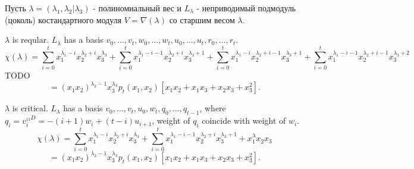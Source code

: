 Пусть $ \lambda = (\lambda_1, \lambda_2 | \lambda_3) $ - полиномиальный вес и $L_{\lambda}$ - неприводимый подмодуль (цоколь) костандартного модуля $V = \nabla(\lambda)$ со старшим весом $\lambda$.

$\lambda$ is reqular.
$L_\lambda$ has a basis $v_0, \ldots, v_t, w_0, \ldots, w_t, u_0, \ldots, u_t, r_0, \ldots, r_t$.
$$\chi(\lambda) = \sum\limits_{i=0}^{t}x_1^{\lambda_1 - i}x_2^{\lambda_2 + i}x_3^{\lambda_3} + \sum\limits_{i=0}^{t}x_1^{\lambda_1 - i - 1}x_2^{\lambda_2 + i}x_3^{\lambda_3 + 1} +
\sum\limits_{i=0}^{t}x_1^{\lambda_1 - i}x_2^{\lambda_2 + i - 1}x_3^{\lambda_3 + 1} + 
\sum\limits_{i=0}^{t}x_1^{\lambda_1 - i - 1}x_2^{\lambda_2 + i- 1}x_3^{\lambda_3 + 2}$$
TODO
$$ = (x_1 x_2)^{\lambda_2 - 1}x_3^{\lambda_3}p_t (x_1, x_2) [x_1 x_2 + x_1 x_3 + x_2 x_3 + x_3^2].$$

$\lambda$ is critical.
$L_\lambda$ has a basis $v_0, \ldots, v_t, u_0, w_t, q_0, \ldots, q_{t - 1}$, 
where $q_i = v_i^{_{13} D} = -(i + 1)w_i + (t - i)u_{i + 1}$,
weight of $q_i$ coincide with weight of $w_i$.
$$\chi(\lambda) = \sum\limits_{i=0}^{t}x_1^{\lambda_1 - i}x_2^{\lambda_2 + i}x_3^{\lambda_3} + \sum\limits_{i=0}^{t}x_1^{\lambda_1 - i - 1}x_2^{\lambda_2 + i}x_3^{\lambda_3 + 1} + 
x_1^{\lambda}x_2^{}x_3^{}$$
$$ = (x_1 x_2)^{\lambda_2 - 1}x_3^{\lambda_3}p_t (x_1, x_2) [x_1 x_2 + x_1 x_3 + x_2 x_3 + x_3^2].$$